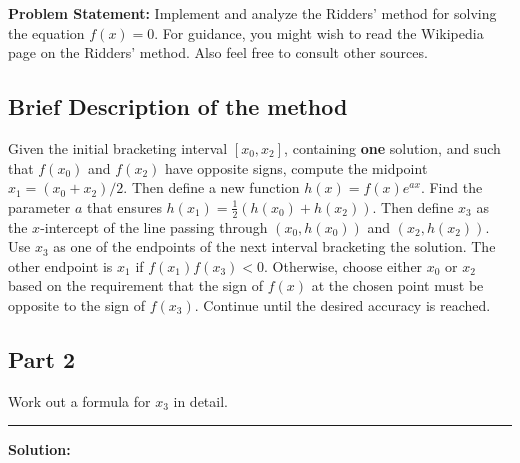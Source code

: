 \clearpage
{}

\textbf{Problem Statement:} Implement and analyze the Ridders' method for solving the equation $f(x) = 0$. For guidance, you might wish to read the Wikipedia page on the Ridders' method. Also feel free to consult other sources.

\subsection*{Brief Description of the method}

Given the initial bracketing interval $[x_0, x_2]$, containing \textbf{one} solution, and such that $f(x_0)$ and $f(x_2)$ have opposite signs, compute the midpoint $x_1 = (x_0 + x_2)/2$. Then define a new function $h(x) = f(x)e^{ax}$. Find the parameter $a$ that ensures $h(x_1) = \frac{1}{2}(h(x_0) + h(x_2))$. Then define $x_3$ as the $x$-intercept of the line passing through $(x_0, h(x_0))$ and $(x_2, h(x_2))$. Use $x_3$ as one of the endpoints of the next interval bracketing the solution. The other endpoint is $x_1$ if $f(x_1)f(x_3) < 0$. Otherwise, choose either $x_0$ or $x_2$ based on the requirement that the sign of $f(x)$ at the chosen point must be opposite to the sign of $f(x_3)$. Continue until the desired accuracy is reached.

\subsection*{Part 2}

Work out a formula for $x_3$ in detail.

\noindent\rule{\textwidth}{0.4pt}

\vspace{1em}

\textbf{Solution:}

\begin{center}
\end{center}

